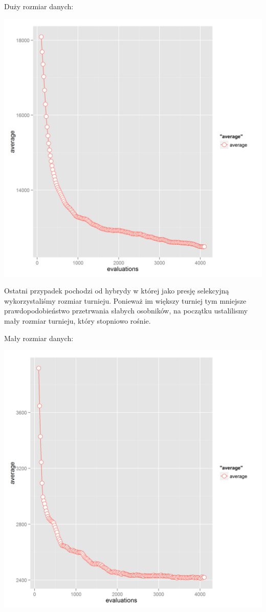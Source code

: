 Duży rozmiar danych:

\includegraphics[]{mutation_cooling_graph2.png}

Ostatni przypadek pochodzi od hybrydy w której jako presję selekcyjną wykorzystaliśmy rozmiar turnieju. Ponieważ im większy turniej tym mniejsze prawdopodobieństwo przetrwania słabych osobników, na początku ustalilismy mały rozmiar turnieju, który stopniowo rośnie.

Mały rozmiar danych:

\includegraphics[]{tournament_cooling_graph0.png}

